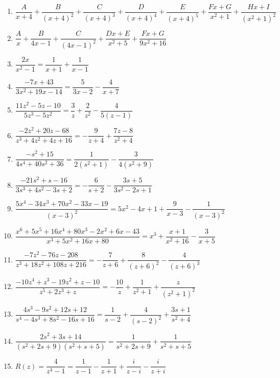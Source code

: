 \begin{enumerate}
\setcounter{enumi}{\value{HW}}

\item $\dfrac{A}{x + 4} + \dfrac{B}{(x + 4)^{2}} + \dfrac{C}{(x + 4)^{3}} + \dfrac{D}{(x + 4)^{4}} + \dfrac{E}{(x + 4)^{5}} + \dfrac{Fx + G}{x^{2} + 1} + \dfrac{Hx + I}{(x^{2} + 1)^{2}}$
\item $\dfrac{A}{x} + \dfrac{B}{4x - 1} + \dfrac{C}{(4x - 1)^{2}} + \dfrac{Dx + E}{x^{2} + 5} + \dfrac{Fx + G}{9x^{2} + 16}$


\item $\dfrac{2x}{x^{2} - 1} = \dfrac{1}{x + 1} + \dfrac{1}{x - 1}$
\item $\dfrac{-7x + 43}{3x^{2} + 19x - 14}= \dfrac{5}{3x - 2} - \dfrac{4}{x + 7}$


\item $\dfrac{11z^{2} - 5z - 10}{5z^{3} - 5z^{2}} = \dfrac{3}{z} + \dfrac{2}{z^{2}} - \dfrac{4}{5(z - 1)}$
\item $\dfrac{-2z^{2} + 20z - 68}{z^{3} + 4z^{2} + 4z + 16} = -\dfrac{9}{z + 4} + \dfrac{7z - 8}{z^{2} + 4}$


\item $\dfrac{-s^{2} + 15}{4s^{4} + 40s^{2} + 36} = \dfrac{1}{2(s^{2} + 1)} - \dfrac{3}{4(s^{2} + 9)}$
\item $\dfrac{-21s^{2} + s - 16}{3s^{3} + 4s^{2} - 3s + 2} = -\dfrac{6}{s + 2} - \dfrac{3s + 5}{3s^{2} - 2s + 1}$


\item $\dfrac{5x^{4} - 34x^{3} + 70x^{2} - 33x - 19}{(x - 3)^{2}} = 5x^{2} - 4x + 1 + \dfrac{9}{x - 3} - \dfrac{1}{(x - 3)^{2}}$
\item $\dfrac{x^{6} + 5x^{5} + 16x^{4} + 80x^{3} - 2x^{2} + 6x - 43}{x^{3} + 5x^{2} + 16x + 80} = x^{3} + \dfrac{x + 1}{x^{2} + 16} - \dfrac{3}{x + 5}$


\item $\dfrac{-7z^{2} - 76z - 208}{z^{3} + 18z^{2} + 108z + 216} = -\dfrac{7}{z + 6} + \dfrac{8}{(z + 6)^{2}} - \dfrac{4}{(z + 6)^{3}}$
\item $\dfrac{-10z^{4} + z^{3} - 19z^{2} + z - 10}{z^{5} + 2z^{3} + z} = -\dfrac{10}{z} + \dfrac{1}{z^{2} + 1} + \dfrac{z}{(z^{2} + 1)^{2}}$


\item $\dfrac{4s^{3} - 9s^{2} + 12s + 12}{s^{4} - 4s^{3} + 8s^{2} - 16s + 16}= \dfrac{1}{s - 2} + \dfrac{4}{(s - 2)^{2}} + \dfrac{3s + 1}{s^{2} + 4}$
\item $\dfrac{2s^{2} + 3s + 14}{(s^{2} + 2s + 9)(s^{2} + s + 5)} = \dfrac{1}{s^{2} + 2s + 9} + \dfrac{1}{s^{2} + s + 5}$

\item $R(z) = \dfrac{4}{z^4-1} = \dfrac{1}{z-1} - \dfrac{1}{z+1} + \dfrac{i}{z-i} -  \dfrac{i}{z+i} $

\end{enumerate}

